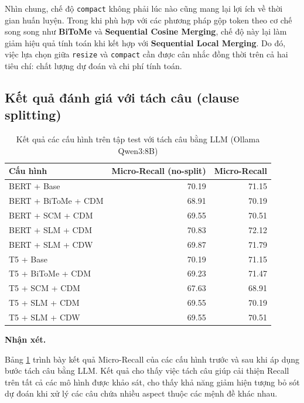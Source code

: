 Nhìn chung, chế độ \texttt{compact} không phải lúc nào cũng mang lại
lợi ích về thời gian huấn luyện. Trong khi phù hợp với các phương pháp
gộp token theo cơ chế song song như \textbf{BiToMe} và
\textbf{Sequential Cosine Merging}, chế độ này lại làm giảm hiệu quả tính toán
khi kết hợp với \textbf{Sequential Local Merging}. Do đó, việc lựa chọn giữa
\texttt{resize} và \texttt{compact} cần được cân nhắc đồng thời trên cả
hai tiêu chí: chất lượng dự đoán và chi phí tính toán.




\subsection{Kết quả đánh giá với tách câu (clause splitting)}
\label{subsec:clause_split}

\begin{table}[H]
\centering
\caption{Kết quả các cấu hình trên tập test với tách câu bằng LLM (Ollama Qwen3:8B)}
\label{tab:t5_split}
\small
\begin{tabular}{@{}lrr@{}}
\toprule
\textbf{Cấu hình} & \textbf{Micro-Recall (no-split)} & \textbf{Micro-Recall} \\
\midrule
BERT + Base           & 70.19 & 71.15 \\
BERT + BiToMe + CDM   & 68.91 & 70.19 \\
BERT + SCM + CDM      & 69.55 & 70.51 \\
BERT + SLM + CDM      & 70.83 & 72.12 \\
BERT + SLM + CDW      & 69.87 & 71.79 \\
\midrule
T5 + Base             & 70.19 & 71.15 \\
T5 + BiToMe + CDM     & 69.23 & 71.47 \\
T5 + SCM + CDM        & 67.63 & 68.91 \\
T5 + SLM + CDM        & 69.55 & 70.19 \\
T5 + SLM + CDW        & 69.55 & 70.51 \\
\bottomrule
\end{tabular}
\end{table}

\textbf{Nhận xét.}

Bảng \ref{tab:t5_split} trình bày kết quả Micro-Recall của các cấu hình trước và sau khi áp dụng bước tách câu bằng LLM. Kết quả cho thấy việc tách câu giúp cải thiện Recall trên tất cả các mô hình được khảo sát, cho thấy khả năng giảm hiện tượng bỏ sót dự đoán khi xử lý các câu chứa nhiều aspect thuộc các mệnh đề khác nhau.

